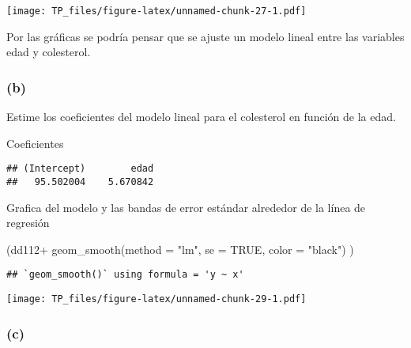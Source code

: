 \documentclass[
]{article}
\newenvironment{Shaded}{\begin{snugshade}}{\end{snugshade}}
\newcommand{\AttributeTok}[1]{\textcolor[rgb]{0.77,0.63,0.00}{#1}}
\newcommand{\CommentTok}[1]{\textcolor[rgb]{0.56,0.35,0.01}{\textit{#1}}}
\newcommand{\ConstantTok}[1]{\textcolor[rgb]{0.00,0.00,0.00}{#1}}
\newcommand{\FunctionTok}[1]{\textcolor[rgb]{0.00,0.00,0.00}{#1}}
\newcommand{\NormalTok}[1]{#1}
\newcommand{\OtherTok}[1]{\textcolor[rgb]{0.56,0.35,0.01}{#1}}
\newcommand{\SpecialCharTok}[1]{\textcolor[rgb]{0.00,0.00,0.00}{#1}}
\newcommand{\StringTok}[1]{\textcolor[rgb]{0.31,0.60,0.02}{#1}}
\begin{document}
\texttt{[image: TP\_files/figure-latex/unnamed-chunk-27-1.pdf]}

Por las gráficas se podría pensar que se ajuste un modelo lineal entre
las variables edad y colesterol.

\hypertarget{b-2}{%
\subsubsection{(b)}\label{b-2}}

Estime los coeficientes del modelo lineal para el colesterol en función
de la edad.

Coeficientes

\begin{Shaded}
\end{Shaded}

\begin{verbatim}
## (Intercept)        edad 
##   95.502004    5.670842
\end{verbatim}

Grafica del modelo y las bandas de error estándar alrededor de la línea
de regresión

\begin{Shaded}
\begin{Highlighting}[]
\NormalTok{(dd112}\SpecialCharTok{+} \FunctionTok{geom\_smooth}\NormalTok{(}\AttributeTok{method =} \StringTok{"lm"}\NormalTok{, }\AttributeTok{se =} \ConstantTok{TRUE}\NormalTok{, }\AttributeTok{color =} \StringTok{"black"}\NormalTok{) )}
\end{Highlighting}
\end{Shaded}

\begin{verbatim}
## `geom_smooth()` using formula = 'y ~ x'
\end{verbatim}

\texttt{[image: TP\_files/figure-latex/unnamed-chunk-29-1.pdf]}

\hypertarget{c-2}{%
\subsubsection{(c)}\label{c-2}}
\end{document}
